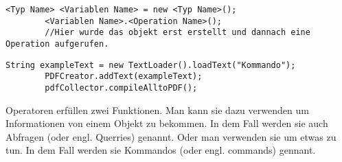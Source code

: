 \begin{enumerate}
\begin{lstlisting}[title=\textbf{Kommando Syntax},firstnumber=4]
        <Typ Name> <Variablen Name> = new <Typ Name>();
        <Variablen Name>.<Operation Name>();
        //Hier wurde das objekt erst erstellt und dannach eine Operation aufgerufen.
            \end{lstlisting}
          \begin{lstlisting}[title=\textbf{Beispiel 3/3 Kommandos},firstnumber=3,frame=lbr]
        String exampleText = new TextLoader().loadText("Kommando");
        PDFCreator.addText(exampleText);
        pdfCollector.compileAlltoPDF();
              \end{lstlisting}
          \begin{Infobox}[Operationen]
              Operatoren erfüllen zwei Funktionen. Man kann sie dazu verwenden um Informationen von einem Objekt zu bekommen.
              In dem Fall werden sie auch Abfragen (oder engl. Querries) genannt.
              Oder man verwenden sie um etwas zu tun. In dem Fall werden sie Kommandos (oder engl. commands) gennant.
          \end{Infobox}


\end{enumerate}
